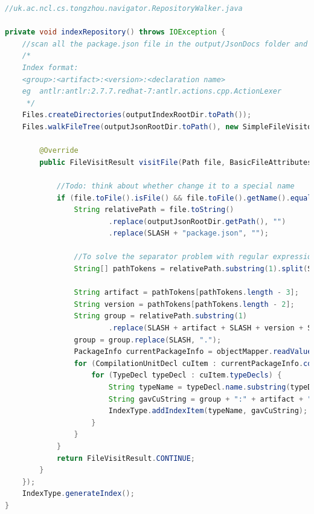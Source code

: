 \documentclass[runningheads]{llncs}
\begin{document}
\begin{lstlisting}[language=Java, caption=Generate index file]
//uk.ac.ncl.cs.tongzhou.navigator.RepositoryWalker.java

private void indexRepository() throws IOException {
	//scan all the package.json file in the output/JsonDocs folder and generate index into index/ folder
	/*
	Index format:
	<group>:<artifact>:<version>:<declaration name>
	eg  antlr:antlr:2.7.7.redhat-7:antlr.actions.cpp.ActionLexer
	 */
	Files.createDirectories(outputIndexRootDir.toPath());
	Files.walkFileTree(outputJsonRootDir.toPath(), new SimpleFileVisitor<Path>() {

		@Override
		public FileVisitResult visitFile(Path file, BasicFileAttributes attributes) throws IOException {

			//Todo: think about whether change it to a special name
			if (file.toFile().isFile() && file.toFile().getName().equals("package.json")) {
				String relativePath = file.toString()
						.replace(outputJsonRootDir.getPath(), "")
						.replace(SLASH + "package.json", "");

				//To solve the separator problem with regular expression
				String[] pathTokens = relativePath.substring(1).split(SLASH.equals("\\") ? "\\\\" : SLASH);

				String artifact = pathTokens[pathTokens.length - 3];
				String version = pathTokens[pathTokens.length - 2];
				String group = relativePath.substring(1)
						.replace(SLASH + artifact + SLASH + version + SLASH + artifact + "-" + version, "");
				group = group.replace(SLASH, ".");
				PackageInfo currentPackageInfo = objectMapper.readValue(file.toFile(), PackageInfo.class);
				for (CompilationUnitDecl cuItem : currentPackageInfo.compilationUnitDecls) {
					for (TypeDecl typeDecl : cuItem.typeDecls) {
						String typeName = typeDecl.name.substring(typeDecl.name.lastIndexOf(".") + 1, typeDecl.name.length());
						String gavCuString = group + ":" + artifact + ":" + version + ":" + typeDecl.name;
						IndexType.addIndexItem(typeName, gavCuString);
					}
				}
			}
			return FileVisitResult.CONTINUE;
		}
	});
	IndexType.generateIndex();
}
\end{lstlisting}
\end{document}
